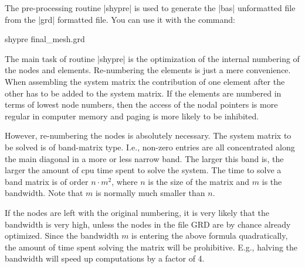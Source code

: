 
%
%
%
%
%
%
%

The pre-processing routine |shypre| is used to generate the
|bas| unformatted file from the |grd| formatted file.
You can use it with the command:

\begin{code}
     shypre final_mesh.grd
\end{code}

The main task of routine |shypre| is the optimization of the 
internal numbering of the nodes and elements.
Re-numbering the elements is just a mere convenience. When
assembling the system matrix the contribution of
one element after the other has to be added to the system matrix.
If the elements are numbered in terms of lowest node numbers,
then the access of the nodal pointers is more regular in 
computer memory and paging is more likely to be inhibited.

However, re-numbering the nodes is absolutely necessary.
The system matrix to be solved is of band-matrix type.
I.e., non-zero entries are all concentrated along the
main diagonal in a more or less narrow band. The larger this
band is, the larger the amount of cpu time spent to
solve the system. The time to solve a band matrix
is of order $n \cdot m^2$, where $n$ is the size of the
matrix and $m$ is the bandwidth. Note that $m$ is normally
much smaller than $n$.

If the nodes are left with the original numbering, it is very likely
that the bandwidth is very high, unless the nodes in the
file GRD are by chance already optimized. Since the bandwidth $m$
is entering the above formula quadratically, the amount
of time spent solving the matrix will be prohibitive.
E.g., halving the bandwidth will speed up computations by
a factor of 4.

